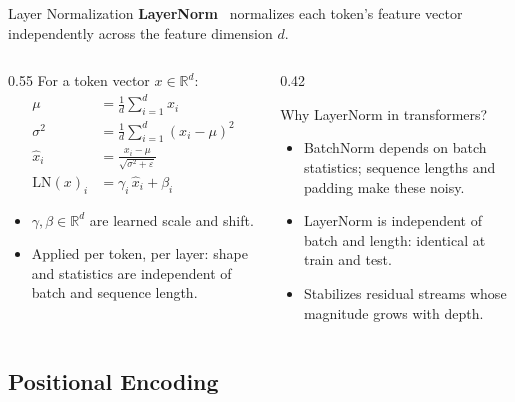 \begin{frame}{Layer Normalization}
  \textbf{LayerNorm}~\cite{ba2016layernorm} normalizes each token's feature vector independently across the feature dimension $d$.

  \begin{columns}[T]
    \begin{column}{0.55\textwidth}
      For a token vector $x \in \mathbb{R}^d$:
      \begin{align*}
        \mu      &= \tfrac{1}{d}\sum_{i=1}^{d} x_i \\
        \sigma^2 &= \tfrac{1}{d}\sum_{i=1}^{d} (x_i - \mu)^2 \\
        \hat{x}_i &= \frac{x_i - \mu}{\sqrt{\sigma^2 + \varepsilon}} \\
        \mathrm{LN}(x)_i &= \gamma_i\, \hat{x}_i + \beta_i
      \end{align*}
      \begin{itemize}
        \item $\gamma, \beta \in \mathbb{R}^d$ are learned scale and shift.
        \item Applied per token, per layer: shape and statistics are independent of batch and sequence length.
      \end{itemize}
    \end{column}
    \begin{column}{0.42\textwidth}
      \begin{block}{Why LayerNorm in transformers?}
        \begin{itemize}
          \item BatchNorm depends on batch statistics; sequence lengths and padding make these noisy.
          \item LayerNorm is independent of batch and length: identical at train and test.
          \item Stabilizes residual streams whose magnitude grows with depth.
        \end{itemize}
      \end{block}
    \end{column}
  \end{columns}
\end{frame}

\subsection{Positional Encoding}

